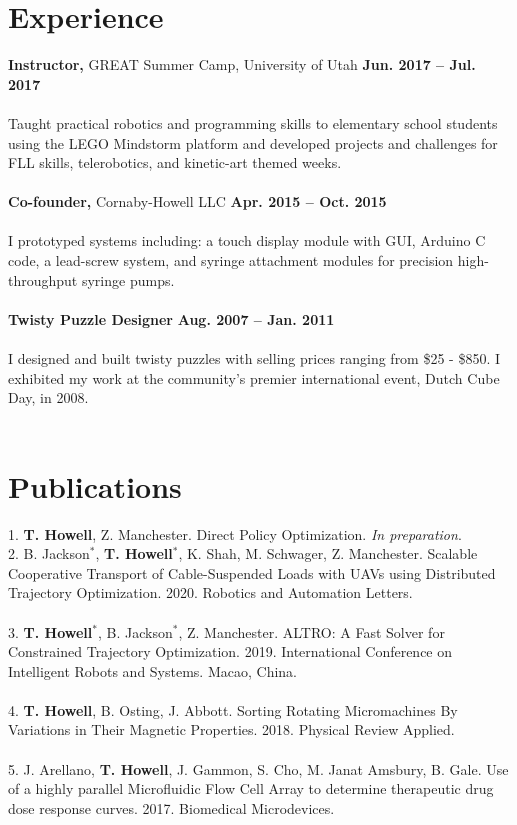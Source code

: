 \documentclass[margin,line]{res}
\begin{document}
\begin{resume}
\section{\sc Experience}
{\bf Instructor,} GREAT Summer Camp, University of Utah
\hfill {\bf Jun. 2017 – Jul. 2017}\\
\\
Taught practical robotics and programming skills to elementary school students using the LEGO Mindstorm platform and developed projects and challenges for FLL skills, telerobotics, and kinetic-art themed weeks.\\
\\
{\bf Co-founder,} Cornaby-Howell LLC
\hfill {\bf Apr. 2015 – Oct. 2015}\\
\\
I prototyped systems including: a touch display module with GUI, Arduino C code, a lead-screw system,
and syringe attachment modules for precision high-throughput syringe pumps.\\
\\
{\bf Twisty Puzzle Designer} 
\hfill {\bf Aug. 2007 – Jan. 2011}\\
\\
I designed and built twisty puzzles with selling prices ranging from \$25 - \$850. I exhibited my work at
the community’s premier international event, Dutch Cube Day, in 2008.\\
\\

\section{\sc Publications}
1. \textbf{T. Howell}, Z. Manchester. Direct Policy Optimization. \textit{In preparation}.\\

2. B. Jackson$^*$, \textbf{T. Howell}$^*$, K. Shah, M. Schwager, Z. Manchester. Scalable Cooperative Transport of Cable-Suspended Loads with UAVs using Distributed Trajectory Optimization. 2020. Robotics and Automation Letters.\\
\\
3. \textbf{T. Howell}$^*$, B. Jackson$^*$, Z. Manchester. ALTRO: A Fast Solver for Constrained Trajectory Optimization. 2019. International Conference on Intelligent Robots and Systems. Macao, China.\\
\\
4. \textbf{T. Howell}, B. Osting, J. Abbott. Sorting Rotating Micromachines By Variations in Their Magnetic
Properties. 2018. Physical Review Applied.\\
\\
5. J. Arellano, \textbf{T. Howell}, J. Gammon, S. Cho, M. Janat Amsbury, B. Gale. Use of a highly parallel
Microfluidic Flow Cell Array to determine therapeutic drug dose response curves. 2017. Biomedical
Microdevices.\\
\\
\\

\end{resume}
\end{document}
